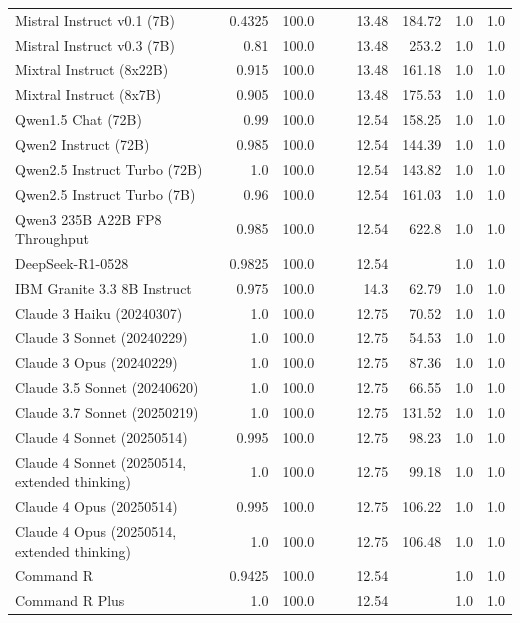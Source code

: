 \begin{table}[htp]
{\begin{tabular}{lrrrrrrrr}
Mistral Instruct v0.1 (7B) & 0.4325 & 100.0 &  &  & 13.48 & 184.72 & 1.0 & 1.0 \\
Mistral Instruct v0.3 (7B) & 0.81 & 100.0 &  &  & 13.48 & 253.2 & 1.0 & 1.0 \\
Mixtral Instruct (8x22B) & 0.915 & 100.0 &  &  & 13.48 & 161.18 & 1.0 & 1.0 \\
Mixtral Instruct (8x7B) & 0.905 & 100.0 &  &  & 13.48 & 175.53 & 1.0 & 1.0 \\
Qwen1.5 Chat (72B) & 0.99 & 100.0 &  &  & 12.54 & 158.25 & 1.0 & 1.0 \\
Qwen2 Instruct (72B) & 0.985 & 100.0 &  &  & 12.54 & 144.39 & 1.0 & 1.0 \\
Qwen2.5 Instruct Turbo (72B) & 1.0 & 100.0 &  &  & 12.54 & 143.82 & 1.0 & 1.0 \\
Qwen2.5 Instruct Turbo (7B) & 0.96 & 100.0 &  &  & 12.54 & 161.03 & 1.0 & 1.0 \\
Qwen3 235B A22B FP8 Throughput & 0.985 & 100.0 &  &  & 12.54 & 622.8 & 1.0 & 1.0 \\
DeepSeek-R1-0528 & 0.9825 & 100.0 &  &  & 12.54 &  & 1.0 & 1.0 \\
IBM Granite 3.3 8B Instruct & 0.975 & 100.0 &  &  & 14.3 & 62.79 & 1.0 & 1.0 \\
Claude 3 Haiku (20240307) & 1.0 & 100.0 &  &  & 12.75 & 70.52 & 1.0 & 1.0 \\
Claude 3 Sonnet (20240229) & 1.0 & 100.0 &  &  & 12.75 & 54.53 & 1.0 & 1.0 \\
Claude 3 Opus (20240229) & 1.0 & 100.0 &  &  & 12.75 & 87.36 & 1.0 & 1.0 \\
Claude 3.5 Sonnet (20240620) & 1.0 & 100.0 &  &  & 12.75 & 66.55 & 1.0 & 1.0 \\
Claude 3.7 Sonnet (20250219) & 1.0 & 100.0 &  &  & 12.75 & 131.52 & 1.0 & 1.0 \\
Claude 4 Sonnet (20250514) & 0.995 & 100.0 &  &  & 12.75 & 98.23 & 1.0 & 1.0 \\
Claude 4 Sonnet (20250514, extended thinking) & 1.0 & 100.0 &  &  & 12.75 & 99.18 & 1.0 & 1.0 \\
Claude 4 Opus (20250514) & 0.995 & 100.0 &  &  & 12.75 & 106.22 & 1.0 & 1.0 \\
Claude 4 Opus (20250514, extended thinking) & 1.0 & 100.0 &  &  & 12.75 & 106.48 & 1.0 & 1.0 \\
Command R & 0.9425 & 100.0 &  &  & 12.54 &  & 1.0 & 1.0 \\
Command R Plus & 1.0 & 100.0 &  &  & 12.54 &  & 1.0 & 1.0 \\

\end{tabular}}
\end{table}
